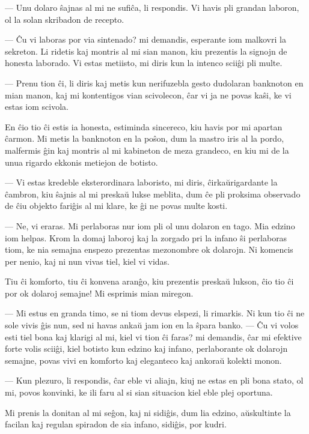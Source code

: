  --- Unu dolaro \^sajnas al mi ne sufi\^ca, li respondis. Vi havis pli
grandan laboron, ol la solan skribadon de recepto.

 --- \^Cu vi laboras por via sintenado? mi demandis, esperante iom
malkovri la sekreton. Li ridetis kaj montris al mi sian manon, kiu
prezentis la signojn de honesta laborado. Vi estas metiisto, mi
diris kun la intenco scii\^gi pli multe.

 --- Prenu tion \^ci, li diris kaj metis kun nerifuzebla gesto dudolaran
banknoton en mian manon, kaj mi kontentigos vian scivolecon, \^car
vi ja ne povas ka\^si, ke vi estas iom scivola.

   En \^cio tio \^ci estis ia honesta, estiminda sincereco, kiu havis por
mi apartan \^carmon. Mi metis la banknoton en la po\^son, dum la
mastro iris al la pordo, malfermis \^gin kaj montris al mi kabineton
de meza grandeco, en kiu mi de la unua rigardo ekkonis metiejon de
botisto.

 --- Vi estas kredeble eksterordinara laboristo, mi diris,
\^cirka\u urigardante la \^cambron, kiu \^sajnis al mi preska\u u
lukse meblita, dum \^ce pli proksima observado de \^ciu objekto
fari\^gis al mi klare, ke \^gi ne povas multe kosti.

 --- Ne, vi eraras. Mi perlaboras nur iom pli ol unu dolaron en tago.
Mia edzino iom helpas. Krom la domaj laboroj kaj la zorgado pri la
infano \^si perlaboras tiom, ke nia semajna enspezo prezentas
mezonombre ok dolarojn. Ni komencis per nenio, kaj ni nun vivas
tiel, kiel vi vidas.

   Tiu \^ci komforto, tiu \^ci konvena aran\^go, kiu prezentis preska\u u
lukson, \^cio tio \^ci por ok dolaroj semajne! Mi esprimis mian
miregon.

 --- Mi estus en granda timo, se ni tiom devus elspezi, li rimarkis. Ni
kun tio \^ci ne sole vivis \^gis nun, sed ni havas anka\u u jam ion
en la \^spara banko. --- \^Cu vi volos esti tiel bona kaj klarigi al
mi, kiel vi tion \^ci faras? mi demandis, \^car mi efektive forte
volis scii\^gi, kiel botisto kun edzino kaj infano, perlaborante ok
dolarojn semajne, povas vivi en komforto kaj eleganteco kaj ankora\u
u kolekti monon.

 --- Kun plezuro, li respondis, \^car eble vi aliajn, kiuj ne estas en
pli bona stato, ol mi, povos konvinki, ke ili faru al si sian
situacion kiel eble plej oportuna.

   Mi prenis la donitan al mi se\^gon, kaj ni sidi\^gis, dum lia edzino,
a\u uskultinte la facilan kaj regulan spiradon de sia infano,
sidi\^gis, por kudri.

